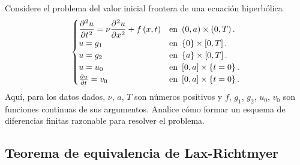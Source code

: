 \begin{questions}
	\question

	Considere el problema del valor inicial frontera de una ecuación hiperbólica
	\begin{equation*}
		\begin{cases}\displaystyle
			\diffp[2]{u}{t}=
			\nu\diffp[2]{u}{x}+
			f\left(x,t\right)  &
			\text{en }\left(0,a\right)\times\left(0,T\right).   \\
			u=g_{1}            &
			\text{en }\left\{0\right\}\times\left[0,T\right].   \\
			u=g_{2}            &
			\text{en }\left\{a\right\}\times\left[0,T\right].   \\
			u=u_{0}            &
			\text{en }\left[0,a\right]\times\left\{t=0\right\}. \\
			\diffp{u}{t}=v_{0} &
			\text{en }\left[0,a\right]\times\left\{t=0\right\}.
		\end{cases}
	\end{equation*}
	Aquí, para los datos dados, $\nu$, $a$, $T$ son números positivos y
	$f$, $g_{1}$, $g_{2}$, $u_{0}$, $v_{0}$ son funciones continuas de sus argumentos.
	Analice cómo formar un esquema de diferencias finitas razonable para resolver el problema.
\end{questions}

\subsection*{Teorema de equivalencia de Lax-Richtmyer}


